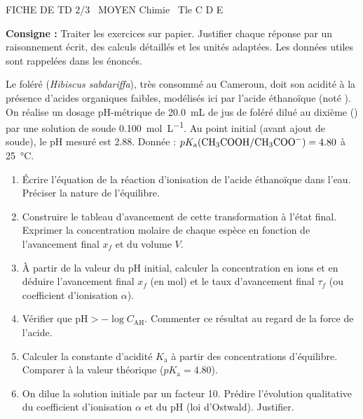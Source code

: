 \documentclass[11pt]{article}
\begin{document}
\begin{tcolorbox}[enhanced,colback=popink,colframe=popink,arc=10pt,boxrule=0pt,left=12pt,right=12pt,top=9pt,bottom=9pt]
{\color{white}\popxbold\small FICHE DE TD 2/3 \textbullet\ MOYEN \hfill Chimie \textbullet\ Tle C D E\par}
\end{tcolorbox}
\vspace{4pt}
\noindent \textbf{Consigne :} Traiter les exercices sur papier. Justifier chaque réponse par un raisonnement écrit, des calculs détaillés et les unités adaptées. Les données utiles sont rappelées dans les énoncés.

\begin{exercice}
Le foléré (\textit{Hibiscus sabdariffa}), très consommé au Cameroun, doit son acidité à la présence d'acides organiques faibles, modélisés ici par l'acide éthanoïque  (noté ). On réalise un dosage pH-métrique de \SI{20.0}{mL} de jus de foléré dilué au dixième () par une solution de soude  \SI{0.100}{mol L^{-1}}. Au point initial (avant ajout de soude), le pH mesuré est \num{2.88}. Donnée : $pK_{\text{a}}(\ce{CH3COOH/CH3COO-}) = 4.80$ à \SI{25}{\celsius}.
\begin{enumerate}
    \item Écrire l'équation de la réaction d'ionisation de l'acide éthanoïque dans l'eau. Préciser la nature de l'équilibre.
    \item Construire le tableau d'avancement de cette transformation à l'état final. Exprimer la concentration molaire de chaque espèce en fonction de l'avancement final $x_f$ et du volume $V$.
    \item À partir de la valeur du pH initial, calculer la concentration en ions  et en déduire l'avancement final $x_f$ (en mol) et le taux d'avancement final $\tau_f$ (ou coefficient d'ionisation $\alpha$).
    \item Vérifier que $\text{pH} > -\log C_{\text{AH}}$. Commenter ce résultat au regard de la force de l'acide.
    \item Calculer la constante d'acidité $K_{\text{a}}$ à partir des concentrations d'équilibre. Comparer à la valeur théorique ($pK_{\text{a}} = 4.80$).
    \item On dilue la solution initiale par un facteur 10. Prédire l'évolution qualitative du coefficient d'ionisation $\alpha$ et du pH (loi d'Ostwald). Justifier.
\end{enumerate}
\end{exercice}
\end{document}
